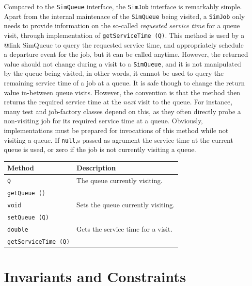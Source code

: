 \documentclass[12pt]{book}
\begin{document}
Compared to the \lstinline|SimQueue| interface,
  the \lstinline|SimJob| interface is remarkably simple.
Apart from the internal maintenace of the \lstinline-SimQueue-
  being visited,
  a \lstinline-SimJob- only needs to provide information on the
  so-called {\em requested service time\/} for a queue visit,
  through implementation of
  \lstinline-getServiceTime (Q)-.
This method is used by a {@link SimQueue} to query the requested service time,
  and appropriately schedule a departure event for the job,
  but it can be called anytime.
However, the returned value should not change during a visit to a \lstinline-SimQueue-,
  and it is not manipulated by the queue being visited, in other words,
  it cannot be used to query the remaining service time of a job at a queue.
It is safe though to change the return value in-between queue visits.
However, the convention is
  that the method then returns the required service time at the {\em next} visit to
  the queue.
For instance, many test and job-factory classes depend on this, as they often directly probe a non-visiting job for
its required service time at a queue.
Obviously, implementations must be prepared for invocations of this method while not visiting a queue.
If \lstinline|null|,s passed as agrument
  the service time at the current queue is used,
  or zero if the job is not currently visiting a queue.

\begin{tabular}{|l|l|}
  \hline
  {\bf Method} & {\bf Description} \\
  \hline
  \lstinline[basicstyle=\footnotesize]!Q!
    & The queue currently visiting.
    \\
  \lstinline[basicstyle=\footnotesize]!getQueue ()!
    &
    \\ \hline
  \lstinline[basicstyle=\footnotesize]!void!
    & Sets the queue currently visiting.
    \\
  \lstinline[basicstyle=\footnotesize]!setQueue (Q)!
    &
    \\ \hline
  \lstinline[basicstyle=\footnotesize]!double!
    & Gets the service time for a visit.
    \\
  \lstinline[basicstyle=\footnotesize]!getServiceTime (Q)!
    &
    \\ \hline
\end{tabular}

\section{Invariants and Constraints}
\end{document}
